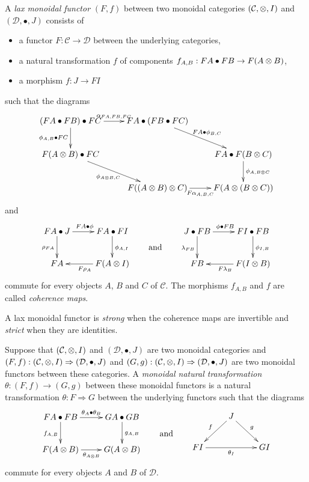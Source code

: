 \begin{definition}
A \emph{lax monoidal functor} $(F,f)$ between two monoidal categories $(\mathcal{C},\otimes,I)$ and $(\mathcal{D},\bullet,J)$ consists of
\begin{itemize}
\item a functor $F:\mathcal{C}\to\mathcal{D}$ between the underlying categories,
\item a natural transformation $f$ of components $f_{A,B}:FA\bullet FB\to F(A\otimes B)$,
\item a morphism $f:J\to FI$
\end{itemize}
such that the diagrams
\begin{equation*}
\xymatrix{
    (FA\bullet FB)\bullet FC\ar[d]_{\phi_{A,B}\bullet FC}\ar[r]^{\alpha_{FA,FB,FC}}& FA\bullet(FB\bullet FC)\ar[dr]^{FA\bullet\phi_{B,C}}\\
    F(A\otimes B)\bullet FC\ar[dr]_{\phi_{A\otimes B,C}}& & FA\bullet F(B\otimes C)\ar[d]^{\phi_{A,B\otimes C}}\\
    & F((A\otimes B)\otimes C)\ar[r]_{F\alpha_{A,B,C}}& F(A\otimes(B\otimes C))
}
\end{equation*}
and
\begin{equation*}
\vcenter{\vbox{\xymatrix{
    FA\bullet J\ar[d]_{\rho_{FA}}\ar[r]^{FA\bullet\phi}& FA\bullet FI\ar[d]^{\phi_{A,I}}\\
    FA& \ar[l]^{F\rho_A}F(A\otimes I)
}}}
\qquad\text{and}\qquad
\vcenter{\vbox{\xymatrix{
    J\bullet FB\ar[d]_{\lambda_{FB}}\ar[r]^{\phi\bullet FB}& FI\bullet FB\ar[d]^{\phi_{I,B}}\\
    FB& \ar[l]^{F\lambda_B}F(I\otimes B)
}}}
\end{equation*}
commute for every objects $A$, $B$ and $C$ of $\mathcal{C}$. The morphisms $f_{A,B}$ and $f$ are called \emph{coherence maps}.

A lax monoidal functor is \emph{strong} when the coherence maps are invertible and \emph{strict} when they are identities.
\end{definition}

\begin{definition}
Suppose that $(\mathcal{C},\otimes,I)$ and $(\mathcal{D},\bullet,J)$ are two monoidal categories and
$(F,f):(\mathcal{C},\otimes,I)\Rightarrow(\mathcal{D},\bullet,J)$
and
$(G,g):(\mathcal{C},\otimes,I)\Rightarrow(\mathcal{D},\bullet,J)$
are two monoidal functors between these categories. A \emph{monoidal natural transformation} $\theta:(F,f)\to (G,g)$ between these monoidal functors is a natural transformation $\theta:F\Rightarrow G$ between the underlying functors such that the diagrams
\begin{equation*}
\vcenter{\vbox{\xymatrix{
    FA\bullet FB\ar[d]_{f_{A,B}}\ar[r]^{\theta_A\bullet\theta_B}& \ar[d]^{g_{A,B}}GA\bullet GB\\
    F(A\tens B)\ar[r]_{\theta_{A\tens B}}& G(A\tens B)
}}}
\qquad\text{and}\qquad
\vcenter{\vbox{\xymatrix{
  & \ar[dl]_{f}J\ar[dr]^{g}& \\
  FI\ar[rr]_{\theta_I}& & GI
}}}
\end{equation*}
commute for every objects $A$ and $B$ of $\mathcal{D}$.
\end{definition}

